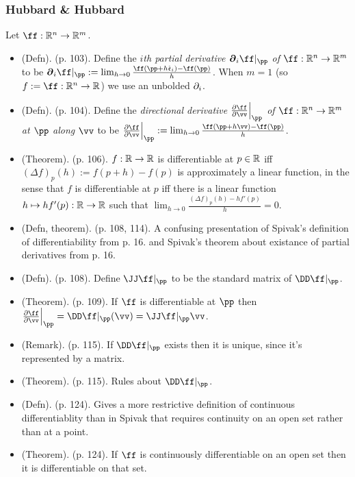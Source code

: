 \subsubsection*{Hubbard \& Hubbard}

Let $\ff:\R^n \rightarrow \R^m$.

\begin{itemize}
    \item (Defn). (p. 103). Define the \textit{$i$th partial derivative $\boldsymbol{\pd}_i \ff|_\pp$ of $\ff:\R^n \rightarrow \R^m$} to be $\boldsymbol{\pd}_i \ff|_\pp := \lim_{h \rightarrow 0} \frac{\ff(\pp + h \see_i) - \ff(\pp)}{h}$. When $m = 1$ (so $f := \ff:\R^n \rightarrow \R$) we use an unbolded $\partial_i$.
    \item (Defn). (p. 104). Define the \textit{directional derivative $\frac{\pd \ff}{\pd \vv}\Big|_\pp$ of $\ff:\R^n \rightarrow \R^m$ at $\pp$ along $\vv$} to be $\frac{\pd \ff}{\pd \vv}\Big|_\pp := \lim_{h \rightarrow 0} \frac{\ff(\pp + h \vv) - \ff(\pp)}{h}$.
    \item (Theorem). (p. 106). $f: \mathbb{R} \rightarrow \mathbb{R}$ is differentiable at $p \in \mathbb{R}$ iff $(\Delta f)_p(h) := f(p + h) - f(p)$ is approximately a linear function, in the sense that $f$ is differentiable at $p$ iff there is a linear function $h \mapsto hf'(p):\mathbb{R} \rightarrow \mathbb{R}$ such that $\lim_{h \rightarrow 0} \frac{(\Delta f)_p(h) - hf'(p)}{h} = 0$.
    \item (Defn, theorem). (p. 108, 114). A confusing presentation of Spivak's definition of differentiability from p. 16. and Spivak's theorem about existance of partial derivatives from p. 16.
    \item (Defn). (p. 108). Define $\JJ \ff|_\pp$ to be the standard matrix of $\DD \ff|_\pp$.
    \item (Theorem). (p. 109). If $\ff$ is differentiable at $\pp$ then $\frac{\pd \ff}{\pd \vv}\Big|_\pp = \DD \ff|_\pp(\vv) = \JJ \ff|_\pp \vv$.
    \item (Remark). (p. 115). If $\DD \ff|_\pp$ exists then it is unique, since it's represented by a matrix.
    \item (Theorem). (p. 115). Rules about $\DD \ff|_\pp$.
    \item (Defn). (p. 124). Gives a more restrictive definition of continuous differentiablity than in Spivak that requires continuity on an open set rather than at a point.
    \item (Theorem). (p. 124). If $\ff$ is continuously differentiable on an open set then it is differentiable on that set.

\end{itemize}
